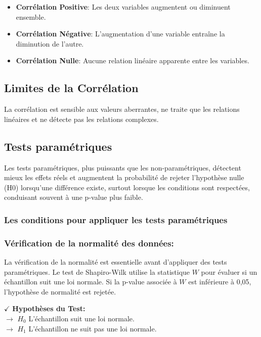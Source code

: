 \begin{itemize}
 \item \textbf{Corrélation Positive}: Les deux variables augmentent ou diminuent ensemble.
 \item \textbf{Corrélation Négative}: L'augmentation d'une variable entraîne la diminution de l'autre.
 \item \textbf{Corrélation Nulle}: Aucune relation linéaire apparente entre les variables.
\end{itemize}

\subsection*{Limites de la Corrélation} 

La corrélation est sensible aux valeurs aberrantes, ne traite que les relations linéaires et ne détecte pas les relations complexes.

\subsection{Tests paramétriques}

Les tests paramétriques, plus puissants que les non-paramétriques, détectent mieux les effets réels et augmentent la probabilité de rejeter l'hypothèse nulle (H0) lorsqu'une différence existe, surtout lorsque les conditions sont respectées, conduisant souvent à une p-value plus faible.
\subsubsection{Les conditions pour appliquer les tests paramétriques}
\subsubsection*{Vérification de la normalité des données:}

La vérification de la normalité est essentielle avant d'appliquer des tests paramétriques. Le test de Shapiro-Wilk utilise la statistique \( W \) pour évaluer si un échantillon suit une loi normale. Si la p-value associée à \( W \) est inférieure à 0,05, l'hypothèse de normalité est rejetée.

\textbf{\(\checkmark\)} \textbf{Hypothèses du Test:}\\
\noindent \textbf{\(\rightarrow\)} \( H_0 \) L'échantillon suit une loi normale.\\
\textbf{\(\rightarrow\)} \( H_1 \) L'échantillon ne suit pas une loi normale.

